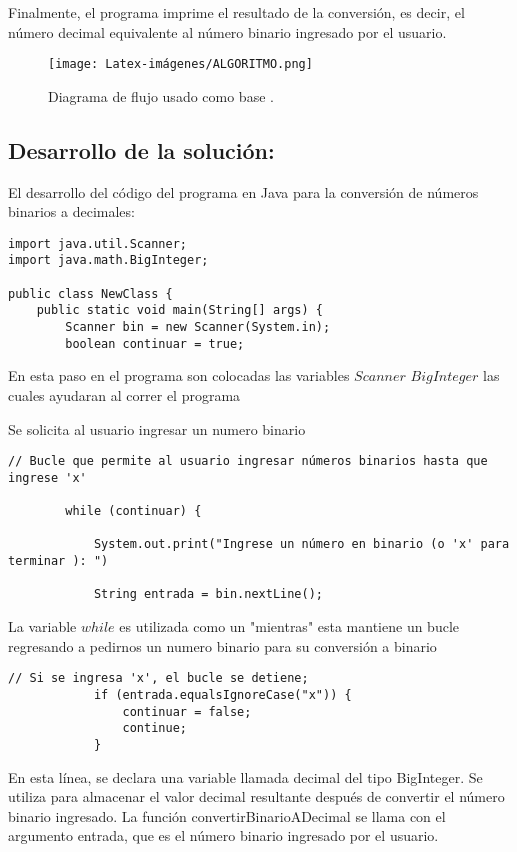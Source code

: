 Finalmente, el programa imprime el resultado de la conversión, es decir, el número decimal equivalente al número binario ingresado por el usuario.


\begin{figure}[H]
    \centering
    \texttt{[image: Latex-imágenes/ALGORITMO.png]}
    \caption{Diagrama de flujo usado como base .}
\end{figure}


\subsection{\textbf{Desarrollo de la solución:}}
El desarrollo del código del programa en Java para la conversión de números binarios a decimales:

\begin{lstlisting}[style=javaStyle]
import java.util.Scanner;
import java.math.BigInteger;

public class NewClass {
    public static void main(String[] args) {
        Scanner bin = new Scanner(System.in);
        boolean continuar = true;
\end{lstlisting}
En esta paso en el programa son colocadas las variables $Scanner$ $BigInteger$
las cuales ayudaran al correr el programa

Se solicita al usuario ingresar un numero binario
\begin{lstlisting}[style=javaStyle]
// Bucle que permite al usuario ingresar números binarios hasta que ingrese 'x'

        while (continuar) {
        
            System.out.print("Ingrese un número en binario (o 'x' para terminar ): ")
            
            String entrada = bin.nextLine();
\end{lstlisting}

 La variable $while$ es utilizada como un "mientras" esta mantiene un bucle regresando a pedirnos un numero binario para su conversión a binario

\begin{lstlisting}[style=javaStyle]
                 // Si se ingresa 'x', el bucle se detiene;
            if (entrada.equalsIgnoreCase("x")) {
                continuar = false;
                continue;
            }
\end{lstlisting}

En esta línea, se declara una variable llamada decimal del tipo BigInteger. Se utiliza para almacenar el valor decimal resultante después de convertir el número binario ingresado. La función convertirBinarioADecimal se llama con el argumento entrada, que es el número binario ingresado por el usuario.

